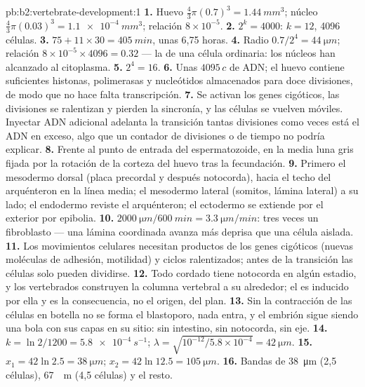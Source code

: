 \begin{solution}{pb:b2:vertebrate-development:1}
\textbf{1.} Huevo $\tfrac43\pi(0.7)^{3} = \qty{1.44}{mm^3}$; núcleo
$\tfrac43\pi(0.03)^{3} = \qty{1.1e-4}{mm^3}$; relación $8\times
10^{-5}$.
\textbf{2.} $2^{k} = 4000$: $k = 12$, 4096 células.
\textbf{3.} $75 + 11\times 30 = \qty{405}{min}$, unas 6,75 horas.
\textbf{4.} Radio $0.7/2^{4} = \qty{44}{\micro m}$; relación $8\times
10^{-5}\times 4096 = 0.32$ --- la de una célula ordinaria: los núcleos han
alcanzado al citoplasma.
\textbf{5.} $2^{4} = 16$.
\textbf{6.} Unas $4095\,c$ de ADN; el huevo contiene suficientes histonas,
polimerasas y nucleótidos almacenados para doce divisiones, de modo que no
hace falta transcripción.
\textbf{7.} Se activan los genes cigóticos, las divisiones se ralentizan y
pierden la sincronía, y las células se vuelven móviles. Inyectar ADN
adicional adelanta la transición tantas divisiones como veces está el ADN
en exceso, algo que un contador de divisiones o de tiempo no podría
explicar.
\textbf{8.} Frente al punto de entrada del espermatozoide, en la media
luna gris fijada por la rotación de la corteza del huevo tras la
fecundación.
\textbf{9.} Primero el mesodermo dorsal (placa precordal y después
notocorda), hacia el techo del arquénteron en la línea media; el
mesodermo lateral (somitos, lámina lateral) a su lado; el endodermo
reviste el arquénteron; el ectodermo se extiende por el exterior por
epibolia.
\textbf{10.} $\qty{2000}{\micro m}/\qty{600}{min} = \qty{3.3}{\micro
m/min}$: tres veces un fibroblasto --- una lámina coordinada avanza más
deprisa que una célula aislada.
\textbf{11.} Los movimientos celulares necesitan productos de los genes
cigóticos (nuevas moléculas de adhesión, motilidad) y ciclos ralentizados;
antes de la transición las células solo pueden dividirse.
\textbf{12.} Todo cordado tiene notocorda en algún estadio, y los
vertebrados construyen la columna vertebral a su alrededor; el 
es inducido por ella y es la consecuencia, no el origen, del plan.
\textbf{13.} Sin la contracción de las células en botella no se forma el
blastoporo, nada entra, y el embrión sigue siendo una bola con sus capas
en su sitio: sin intestino, sin notocorda, sin eje.
\textbf{14.} $k = \ln 2/1200 = \qty{5.8e-4}{s^{-1}}$; $\lambda =
\sqrt{10^{-12}/5.8\times 10^{-4}} = \qty{42}{\micro m}$.
\textbf{15.} $x_1 = 42\ln 2.5 = \qty{38}{\micro m}$; $x_2 = 42\ln 12.5
= \qty{105}{\micro m}$.
\textbf{16.} Bandas de \qty{38}{\micro m} (2,5 células), \qty{67}{\micro
m} (4,5 células) y el resto.

\end{solution}
